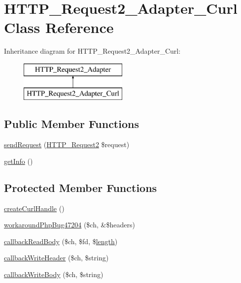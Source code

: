 \hypertarget{classHTTP__Request2__Adapter__Curl}{}\section{H\+T\+T\+P\+\_\+\+Request2\+\_\+\+Adapter\+\_\+\+Curl Class Reference}
\label{classHTTP__Request2__Adapter__Curl}
Inheritance diagram for H\+T\+T\+P\+\_\+\+Request2\+\_\+\+Adapter\+\_\+\+Curl\+:\begin{figure}[H]
\begin{center}
\leavevmode
\includegraphics[height=2.000000cm]{classHTTP__Request2__Adapter__Curl}
\end{center}
\end{figure}
\subsection*{Public Member Functions}
\begin{DoxyCompactItemize}
\item 
\hyperlink{classHTTP__Request2__Adapter__Curl_a9da450eb1bb1492d1b39c22c2f29bb2b}{send\+Request} (\hyperlink{classHTTP__Request2}{H\+T\+T\+P\+\_\+\+Request2} \$request)
\item 
\hyperlink{classHTTP__Request2__Adapter__Curl_a9c8c318ec7a6314f235ef4dfea89e6b2}{get\+Info} ()
\end{DoxyCompactItemize}
\subsection*{Protected Member Functions}
\begin{DoxyCompactItemize}
\item 
\hyperlink{classHTTP__Request2__Adapter__Curl_a905d9fdfe01867e54cbd696091d97516}{create\+Curl\+Handle} ()
\item 
\hyperlink{classHTTP__Request2__Adapter__Curl_a3e62b54a633faf5aba9d0b4eb0a3c1d0}{workaround\+Php\+Bug47204} (\$ch, \&\$headers)
\item 
\hyperlink{classHTTP__Request2__Adapter__Curl_a02043fb25c4aa88dfe000cbb037011b0}{callback\+Read\+Body} (\$ch, \$fd, \$\hyperlink{xpresseditor_8min_8js_a8251a40bc2803d85bf8a918f1f288cce}{length})
\item 
\hyperlink{classHTTP__Request2__Adapter__Curl_a8279ebf99b6de452d163e747f34d6f11}{callback\+Write\+Header} (\$ch, \$string)
\item 
\hyperlink{classHTTP__Request2__Adapter__Curl_ad1049b669850af2040d3360144f90e8c}{callback\+Write\+Body} (\$ch, \$string)
\end{DoxyCompactItemize}
